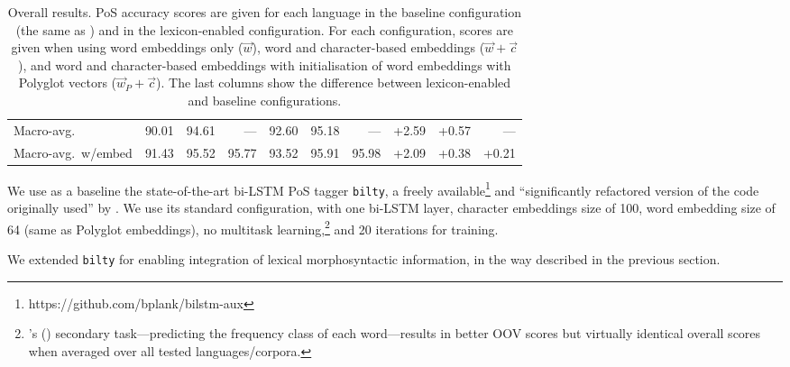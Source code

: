 \documentclass[11pt,letterpaper]{article}
\begin{document}
\begin{table}[t]
\begin{tabular}{l|rrr|rrr|rrr}
\midrule
Macro-avg. & 90.01 & 94.61 & --- & 92.60 & 95.18 & --- & +2.59 & +0.57 & ---\\
Macro-avg.~w/embed & 91.43 & 95.52 & 95.77 & 93.52 & 95.91 & 95.98 & +2.09 & +0.38 & +0.21\\
\end{tabular}
\caption{Overall results. PoS accuracy scores are given for each language in the baseline
  configuration (the same as \citealp{plank16}) and in the lexicon-enabled configuration. For each configuration, scores
are given when using word embeddings only ($\vec{w}$), word and character-based embeddings ($\vec{w}+\vec{c}$), and word
and character-based embeddings with initialisation of word embeddings with Polyglot vectors ($\vec{w}_P+\vec{c}$). The
 last columns show the difference between lexicon-enabled and baseline configurations.{}}\label{tbl:results}
\end{table}

We use as a baseline the state-of-the-art bi-LSTM PoS tagger \texttt{bilty}, a freely
available\footnote{https://github.com/bplank/bilstm-aux} and ``significantly refactored version of the code originally
used'' by \citet{plank16}. We use its standard configuration, with one bi-LSTM layer, character embeddings size of 100,
word embedding size of 64 (same as Polyglot embeddings), no multitask learning,\footnote{\citeauthor{plank16}'s
  (\citeyear{plank16}) secondary task---predicting the frequency class of each word---results in better OOV scores but
  virtually identical overall scores when averaged over all tested languages/corpora.} and 20 iterations for training.

We extended \texttt{bilty} for enabling integration of lexical morphosyntactic information, in the way described in the
previous section.%
\end{document}
